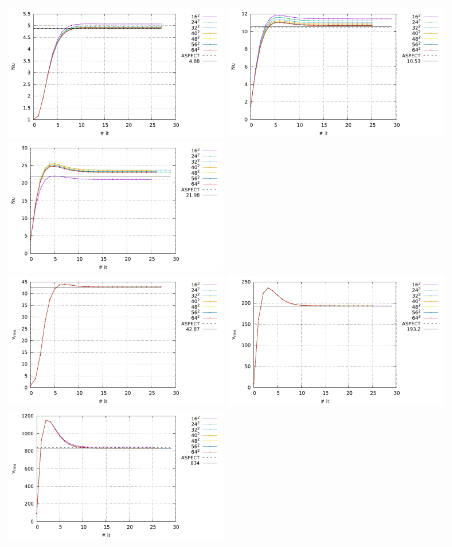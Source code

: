 \begin{center}
\includegraphics[width=5.7cm]{python_codes/fieldstone_110/results_BA/Nu_Ra1e4.pdf}
\includegraphics[width=5.7cm]{python_codes/fieldstone_110/results_BA/Nu_Ra1e5.pdf}
\includegraphics[width=5.7cm]{python_codes/fieldstone_110/results_BA/Nu_Ra1e6.pdf}\\
\includegraphics[width=5.7cm]{python_codes/fieldstone_110/results_BA/vrms_Ra1e4.pdf}
\includegraphics[width=5.7cm]{python_codes/fieldstone_110/results_BA/vrms_Ra1e5.pdf}
\includegraphics[width=5.7cm]{python_codes/fieldstone_110/results_BA/vrms_Ra1e6.pdf}\\

\end{center}

